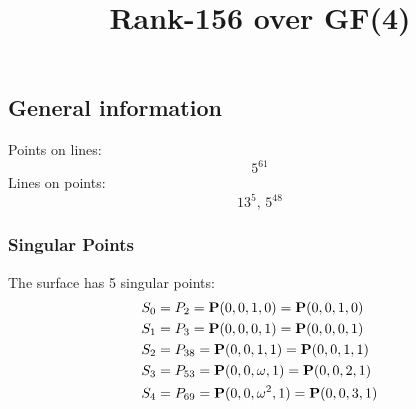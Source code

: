\documentclass{article}
\newcommand\setTBstruts{\def\T{\rule{0pt}{2.6ex}}%
\def\B{\rule[-1.2ex]{0pt}{0pt}}}
\newcommand{\bP}{{\bf P}}
\begin{document}
 
\setTBstruts



{\allowdisplaybreaks%






\title{Rank-156 over GF(4)}
\author{}%
\maketitle%
%
{}



\subsection*{General information}
Points on lines:
$$
5^{61}$$
Lines on points:
$$
13^5,\,5^{48}$$
\subsubsection*{Singular Points}
The surface has 5 singular points:\\
\begin{align*}
S_{0} &= P_{2}=\bP(0, 0, 1, 0) = \bP(0, 0, 1, 0)\\
S_{1} &= P_{3}=\bP(0, 0, 0, 1) = \bP(0, 0, 0, 1)\\
S_{2} &= P_{38}=\bP(0, 0, 1, 1) = \bP(0, 0, 1, 1)\\
S_{3} &= P_{53}=\bP(0, 0, \omega , 1) = \bP(0, 0, 2, 1)\\
S_{4} &= P_{69}=\bP(0, 0, \omega^{2}, 1) = \bP(0, 0, 3, 1)\\
\end{align*}
}
\end{document}
